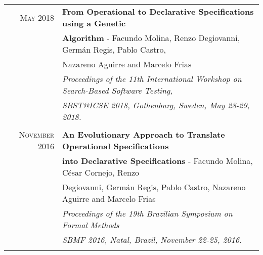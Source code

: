 \documentclass[a4paper,10pt]{article} %
\begin{document}
\begin{longtable}{rl}
\textsc{May} 2018  & \textbf{From Operational to Declarative Specifications using a Genetic} \\ & \textbf{Algorithm} - Facundo Molina, Renzo Degiovanni, Germán Regis, Pablo Castro,\\
& Nazareno Aguirre and Marcelo Frias \\
& \textit{Proceedings of the 11th International Workshop on Search-Based Software Testing,} \\
& \textit{SBST@ICSE 2018, Gothenburg, Sweden, May 28-29, 2018.} \\ & \\

\textsc{November} 2016 & \textbf{An Evolutionary Approach to Translate Operational Specifications} \\ & \textbf{into Declarative Specifications} - Facundo Molina, César Cornejo, Renzo \\
& Degiovanni, Germán Regis, Pablo Castro, Nazareno Aguirre and Marcelo Frias \\
& \textit{Proceedings of the 19th Brazilian Symposium on Formal Methods} \\ 
& \textit{SBMF 2016, Natal, Brazil, November 22-25, 2016.} \\ & \\

\end{longtable}
\end{document}
